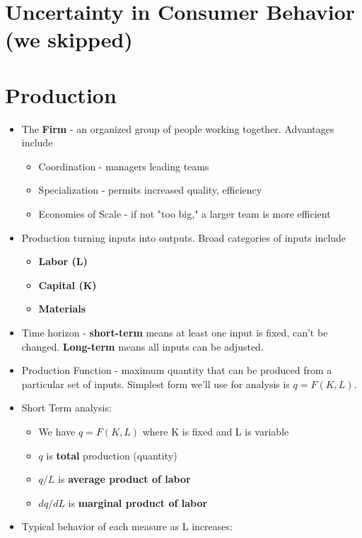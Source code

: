 \documentclass{exam}
\begin{document}
\section{Uncertainty in Consumer Behavior (we skipped)}

\section{Production}

\begin{itemize}
  \item The \textbf{Firm} - an organized group of people working together.  Advantages include
    \begin{itemize}
      \item Coordination - managers leading teams
      \item Specialization - permits increased quality, efficiency
      \item Economies of Scale - if not "too big," a larger team is more efficient
    \end{itemize}
  \item Production turning inputs into outputs.  Broad categories of inputs include
    \begin{itemize}
      \item \textbf{Labor (L)}
      \item \textbf{Capital (K)}
      \item \textbf{Materials}
    \end{itemize}
  \item Time horizon - \textbf{short-term} means at least one input is fixed, can't be changed.  \textbf{Long-term} means
    all inputs can be adjusted.
  \item Production Function - maximum quantity that can be produced from a particular set of inputs. Simplest form we'll use
    for analysis is $q = F(K,L)$.
  \item Short Term analysis:
    \begin{itemize}
      \item We have $q = F(K,L)$ where K is fixed and L is variable
      \item $q$ is \textbf{total} production (quantity)
      \item $q/L$ is \textbf{average product of labor}
      \item $dq/dL$ is \textbf{marginal product of labor}
    \end{itemize}
  \item Typical behavior of each measure as L increases:

\end{itemize}
\end{document}
